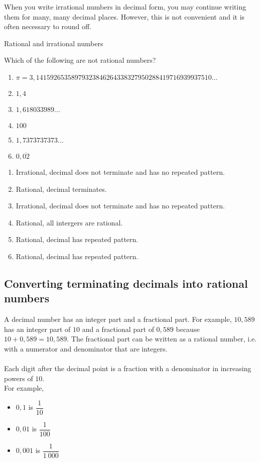 \par
When you write irrational numbers in decimal form, you may continue writing them for many, many
decimal places. However, this is not convenient and it is often necessary to round off.


\begin{wex}{Rational and irrational numbers}
{Which of the following are not rational numbers?\\
\begin{enumerate}[itemsep=5pt, label=\textbf{\arabic*}. ] 
\item $\pi =3,14159265358979323846264338327950288419716939937510\ldots$
\item $1,4$
\item $1,618033989\ldots$
\item $100$
\item $1,7373737373\ldots$
\item $0,\overline{02}$
\end{enumerate}}
{
\begin{enumerate}[itemsep=5pt, label=\textbf{\arabic*}. ] 
\item Irrational, decimal does not terminate and has no repeated pattern. 
\item Rational, decimal terminates.
\item Irrational, decimal does not terminate and has no repeated pattern. 
\item Rational, all intergers are rational.
\item Rational, decimal has repeated pattern.
\item Rational, decimal has repeated pattern.
\end{enumerate}
}
\end{wex}

\subsection{Converting terminating decimals into rational numbers}

A decimal number has an integer part and a fractional part. For example, $10,589$ has an integer part of $10$ and a fractional part of $0,589$ because $10+0,589=10,589$. The fractional part can be written as a rational number, i.e.\@{} with a numerator and denominator that are integers. \\
\\
Each digit after the decimal point is a fraction with a denominator in increasing powers of $10$.\\ For example,
\begin{itemize}
\item $0,1$ is $\dfrac{1}{10}$
\item $0,01$ is $\dfrac{1}{100}$
\item $0,001$ is $\dfrac{1}{1~000}$
\end{itemize}

